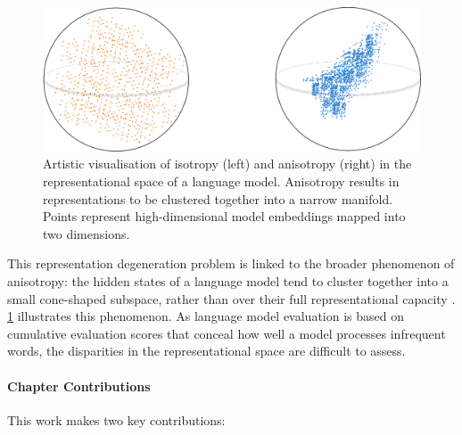 \begin{figure}[ht!]
    \centering
    \includegraphics[width=0.8\linewidth]{chapters/syntatic-smoothing/figures/anisotropy_visualization.pdf}
    \caption{Artistic visualisation of isotropy (left) and anisotropy (right) in the representational space of a language model. Anisotropy results in representations to be clustered together into a
    narrow manifold. Points represent high-dimensional model embeddings mapped into two dimensions.}
    \label{fig:anisotropy_visualization}
\end{figure}

\newpage

This representation degeneration problem is linked to the broader phenomenon of anisotropy: the hidden states of a language model tend to cluster together into a small cone-shaped subspace, rather than over their full representational capacity \citep{arora2016latent, ethayarajh2019contextual, gao2018representation}. \cref{fig:anisotropy_visualization} illustrates this phenomenon. As language model evaluation is based on cumulative evaluation scores that conceal how well a model processes infrequent words, the disparities in the representational space are difficult to assess. 

\paragraph{Chapter Contributions} This work makes two key contributions:

